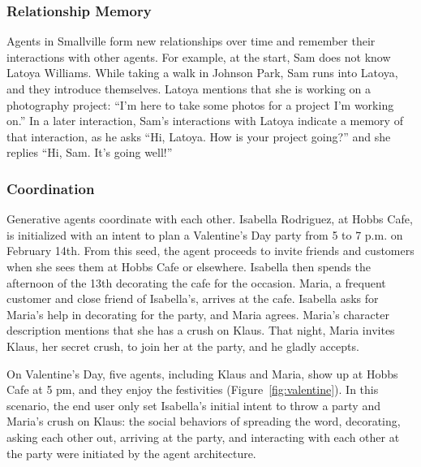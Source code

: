 \subsubsection{Relationship Memory} Agents in Smallville form new relationships over time and remember their interactions with other agents. For example, at the start, Sam does not know Latoya Williams. While taking a walk in Johnson Park, Sam runs into Latoya, and they introduce themselves. Latoya mentions that she is working on a photography project: {\color{darkgray}\small\fontfamily{}\selectfont
``I'm here to take some photos for a project I'm working on.''} In a later interaction, Sam's interactions with Latoya indicate a memory of that interaction, as he asks {\color{darkgray}\small\fontfamily{}\selectfont
``Hi, Latoya. How is your project going?''} and she replies {\color{darkgray}\small\fontfamily{}\selectfont
``Hi, Sam. It’s going well!''}

\subsubsection{Coordination} 
Generative agents coordinate with each other. Isabella Rodriguez, at Hobbs Cafe, is initialized with an intent to plan a Valentine's Day party from 5 to 7 p.m. on February 14th. From this seed, the agent proceeds to invite friends and customers when she sees them at Hobbs Cafe or elsewhere. Isabella then spends the afternoon of the 13th decorating the cafe for the occasion. Maria, a frequent customer and close friend of Isabella's, arrives at the cafe. Isabella asks for Maria's help in decorating for the party, and Maria agrees. Maria's character description mentions that she has a crush on Klaus. That night, Maria invites Klaus, her secret crush, to join her at the party, and he gladly accepts.

On Valentine's Day, five agents, including Klaus and Maria, show up at Hobbs Cafe at 5 pm, and they enjoy the festivities (Figure~\ref{fig:valentine}). In this scenario, the end user only set Isabella's initial intent to throw a party and Maria's crush on Klaus: the social behaviors of spreading the word, decorating, asking each other out, arriving at the party, and interacting with each other at the party were initiated by the agent architecture.

